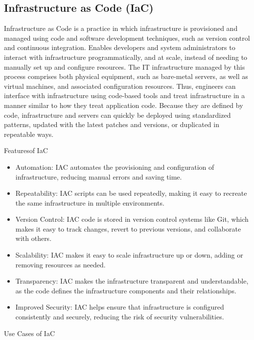 \documentclass[12pt]{book}
\begin{document}
\subsection{Infrastructure as Code (IaC)}
 
Infrastructure as Code is a practice in which infrastructure is provisioned and managed using code and software development techniques, such as version control and continuous integration. Enables developers and system administrators to interact with infrastructure programmatically, and at scale, instead of needing to manually set up and configure resources.
The IT infrastructure managed by this process comprises both physical equipment, such as bare-metal servers, as well as virtual machines, and associated configuration resources. 
Thus, engineers can interface with infrastructure using code-based tools and treat infrastructure in a manner similar to how they treat application code. Because they are defined by code, infrastructure and servers can quickly be deployed using standardized patterns, updated with the latest patches and versions, or duplicated in repeatable ways.

Featuresof IaC

\begin{itemize}
    \item Automation: IAC automates the provisioning and configuration of infrastructure, reducing manual errors and saving time.
    \item Repeatability: IAC scripts can be used repeatedly, making it easy to recreate the same infrastructure in multiple environments.
    \item Version Control: IAC code is stored in version control systems like Git, which makes it easy to track changes, revert to previous versions, and collaborate with others.
    \item Scalability: IAC makes it easy to scale infrastructure up or down, adding or removing resources as needed.
    \item Transparency: IAC makes the infrastructure transparent and understandable, as the code defines the infrastructure components and their relationships.
    \item Improved Security: IAC helps ensure that infrastructure is configured consistently and securely, reducing the risk of security vulnerabilities.
\end{itemize}

Use Cases of IaC
\end{document}
